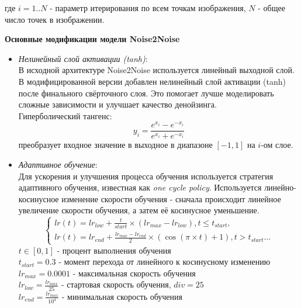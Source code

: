 где $i = 1..N$ - параметр итерирования по всем точкам изображения, $N$ - общее число точек в изображении.
\par \textbf{Основные модификации модели Noise2Noise}
\begin{itemize}[]
	\item \textit{Нелинейный слой активации (tanh)}:\\
	В исходной архитектуре Noise2Noise используется линейный выходной слой. В модифицированной версии добавлен нелинейный слой активации (tanh) после финального свёрточного слоя. Это помогает лучше моделировать сложные зависимости и улучшает качество денойзинга.\\
	Гиперболический тангенс:
	\begin{equation}
		y_i = \frac{e^{x_i} - e^{-x_i}}{e^{x_i} + e^{-x_i}}
	\end{equation}
	преобразует входное значение в выходное в диапазоне $[-1, 1]$ на $i$-ом слое.
	\item \textit{Адаптивное обучение}:\\ 
	Для ускорения и улучшения процесса обучения используется стратегия адаптивного обучения, известная как \textit{one cycle policy}. Используется линейно-косинусное изменение скорости обучения - сначала происходит линейное увеличение скорости обучения, а затем её косинусное уменьшение.
	\begin{equation}
		\left\{ \begin{aligned} 
			lr(t)= lr_{low} + \frac{t}{start} \times (lr_{max} - lr_{low}), t \leq t_{start},\\
			lr(t)= lr_{end} + \frac{lr_{max} - lr_{end}}{2} \times (\cos(\pi\times t) + 1), t > t_{start}\ldots
		\end{aligned} \right.
	\end{equation}
	$t \in [0, 1]$ - процент выполнения обучения\\
	$t_{start} = 0.3$ - момент перехода от линейного к косинусному изменению\\
	$lr_{max} = 0.0001$ - максимальная скорость обучения\\
	$lr_{low} = \frac{lr_{max}}{25}$ - стартовая скорость обучения, $div = 25$\\
	$lr_{end} = \frac{lr_{max}}{10^4}$ - минимальная скорость обучения\\
\end{itemize}

